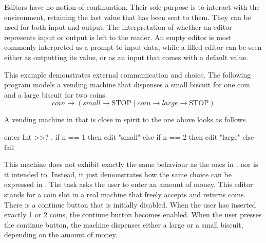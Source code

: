 Editors have no notion of continuation.
Their sole purpose is to interact with the environment, retaining the last value that has been sent to them.
%
They can be used for both input and output.
The interpretation of whether an editor represents input or output is left to the reader.
An empty editor is most commonly interpreted as a prompt to input data, while a filled editor can be seen either as outputting its value, or as an input that comes with a default value.


\begin{example}

This example demonstrates external communication and choice.
The following \CSP program models a vending machine that dispenses a small biscuit for one coin and a large biscuit for two coins. 
\begin{equation*}
  \textit{coin} \to (\textit{small} \to \text{STOP} \mid \textit{coin} \to \textit{large} \to \text{STOP})
\end{equation*}

A vending machine in \TOPHAT that is close in spirit to the one above looks as follows.
\begin{TASK}
  enter Int >>? \n. if n == 1 then edit "small" else if n == 2 then edit "large" else fail
\end{TASK}
This machine does not exhibit exactly the same behaviour as the ones in \CSP, nor is it intended to.
Instead, it just demonstrates how the same choice
can be expressed in \TOPHAT.
The task asks the user to enter an amount of money.
This editor stands for a coin slot in a real machine that freely accepts and returns coins.
There is a continue button that is initially disabled.
When the user has inserted exactly 1 or 2 coins, the continue button becomes enabled.
When the user presses the continue button, the machine dispenses either a large or a small biscuit, depending on the amount of money.

\end{example}



